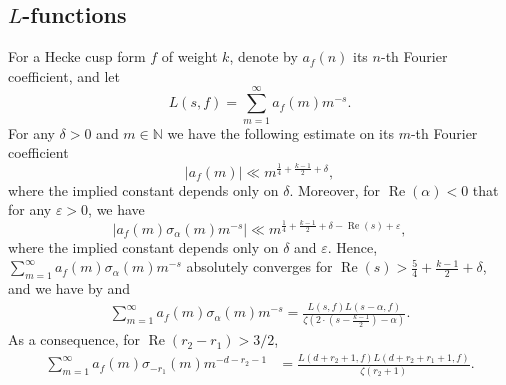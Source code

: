 \documentclass[]{article}
\renewcommand{\Re}{\operatorname{Re}}
\newcommand{\kf}[1]{{\color{magenta}{#1}}}
\begin{document}
\subsection{$L$-functions}

For a Hecke cusp form $f$ of weight $k$, denote by $a_f(n)$ its $n$-th Fourier coefficient, and let 
\begin{equation}
    L(s,f) = \sum_{m=1}^\infty a_f(m) m^{-s}.
\end{equation}
For any $\delta>0$ and $m \in \mathbb{N}$ we have the following estimate on its $m$-th Fourier coefficient \cite[(3.1.22)]{motohashi1997spectral}  
\begin{equation}
|a_f(m)|\ll m^{\frac{1}{4}+\frac{k-1}{2}+\delta},
\end{equation}
 where the implied constant depends only on $\delta$. Moreover, for $\Re(\alpha)<0$ that for any $\varepsilon>0$, we have   
 \begin{equation}
    | a_f(m)  \sigma_{\alpha}(m) m^{-s}| \ll m^{\frac{1}{4}+ \frac{k-1}{2}+\delta-\Re(s) + \varepsilon},
\end{equation}
where the implied constant depends only on $\delta$ and $\varepsilon$. Hence, $        \sum_{m=1}^\infty a_f(m) \sigma_\alpha(m)  m^{-s}$ absolutely converges for $\Re(s) > \frac{5}{4} + \frac{k-1}{2}+\delta$, and  
we have by  \cite[(3.2.7)]{motohashi1997spectral} and  \cite[proof of Proposition 2.1 and (2.11)]{diamantis2010kernels}
\begin{equation}
    \begin{split}
        \sum_{m=1}^\infty a_f(m) \sigma_\alpha(m)  m^{-s} = \frac{L(s,f) L(s-\alpha,f)}{\zeta(2 \cdot (s-\frac{k-1}{2}) - \alpha )}.
    \end{split}
\end{equation}
As a consequence, for $\Re (r_2-r_1) > 3/2$,
\begin{equation}\label{eq:Hecke_sum_product_of_Lvalues}
    \begin{split}
        \sum_{m=1}^\infty    a_f(m) \sigma_{-r_1}(m) m^{-d-r_2-1} &= \frac{L( d+r_2+1, f) L( d+r_2+r_1+1,f ) }{\zeta( r_2 + 1 )}.
    \end{split}
\end{equation}
\end{document}

